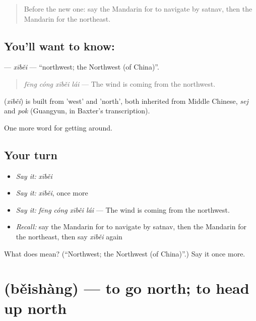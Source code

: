 \begin{quote}
Before the new one: say the Mandarin for to navigate by satnav, then the Mandarin for the northeast.
\end{quote}

\subsection*{You'll want to know: }
\textbf{} — \emph{xīběi} — \textquotedblleft{}northwest; the Northwest (of China)\textquotedblright{}.

\begin{quote}
\textbf{} \emph{fēng cóng xīběi lái} — The wind is coming from the northwest.
\end{quote}

\begin{cousinweb}
\textbf{} (\emph{xīběi}) is built from  'west' and  'north', both inherited from Middle Chinese, \emph{sej} and \emph{pok} (Guangyun, in Baxter's transcription).
\end{cousinweb}

\begin{grammarlens}[title={What you've built}]
One more word for getting around.
\end{grammarlens}

\subsection*{Your turn}
\begin{itemize}
\raggedright
  \item \emph{Say it:} \emph{xīběi}
  \item \emph{Say it:} \emph{xīběi}, once more
  \item \emph{Say it:} \emph{fēng cóng xīběi lái} — The wind is coming from the northwest.
  \item \emph{Recall:} say the Mandarin for to navigate by satnav, then the Mandarin for the northeast, then say \emph{xīběi} again
\end{itemize}

\begin{tcolorbox}[breakable,colback=teal!4,colframe=teal!35!black,title={Before you move on}]
What does  mean? (\textquotedblleft{}Northwest; the Northwest (of China)\textquotedblright{}.) Say it once more.
\end{tcolorbox}
\section[\texorpdfstring{\zh{北上} (běishàng)}{北上 (běishàng)}]{ (běishàng) — to go north; to head up north}

